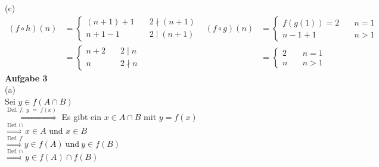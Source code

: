 \documentclass[a4paper, 12pt]{scrartcl}
\theoremstyle{plain}
\begin{document}
(c)
\begin{align*}
(f \circ h)(n) &= \begin{cases}(n+1)+1 &\quad 2  \nmid (n+1) \\ n+1-1 &\quad 2 \mid (n+1) \end{cases} & (f \circ g)(n) &= \begin{cases} f(g(1)) = 2 &\quad n = 1\\ n-1+1 &\quad n > 1\end{cases}\\
&= \begin{cases} n + 2 &\quad 2 \mid n\\n &\quad 2 \nmid n  \end{cases} & &= \begin{cases}2 &\quad n=1\\n &\quad n > 1\end{cases}
\end{align*}
\newpage
\textbf{Aufgabe 3}\\
(a)\\
Sei $y \in f(A \cap B)$\\
$\stackrel{\text{Def.}\;f,\;y\;=\;f(x)}{\Longrightarrow}$ Es gibt ein $x \in A \cap B$ mit $y = f(x)$ \\	
$ \stackrel{\text{Def.}\ \cap}{\Longrightarrow} x \in A$ und $x \in B$\\
$\stackrel{\text{Def.}\;f}{\Longrightarrow} y \in f(A)\ \text{und}\ y \in f(B)$\\
$ \stackrel{\text{Def.}\ \cap}{\Longrightarrow} y \in f(A) \cap f(B)$ \\
\end{document}
